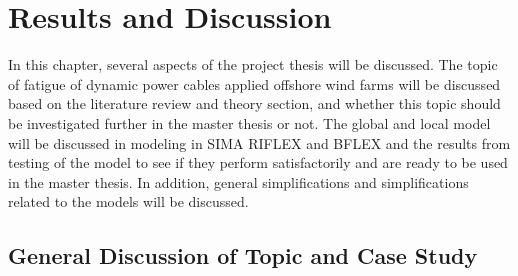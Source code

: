 \chapter{Results and Discussion}
\label{chap:discussion}
 In this chapter, several aspects of the project thesis will be discussed. The topic of fatigue of dynamic power cables applied offshore wind farms will be discussed based on the literature review and theory section, and whether this topic should be investigated further in the master thesis or not. The global and local model will be discussed in modeling in SIMA RIFLEX and BFLEX and the results from testing of the model to see if they perform satisfactorily and are ready to be used in the master thesis. In addition, general simplifications and simplifications related to the models will be discussed. 
 \section{General Discussion of Topic and Case Study}
